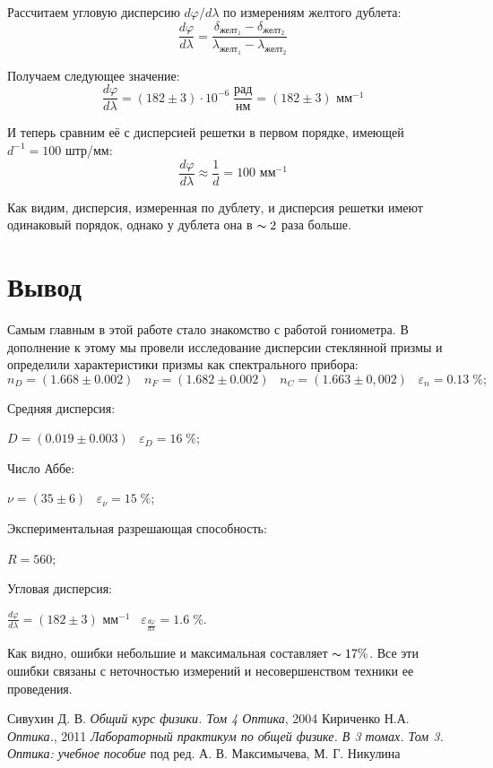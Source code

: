 \documentclass[12pt,a4paper]{article}
\begin{document}
	Рассчитаем угловую дисперсию $d\varphi/d\lambda$ по измерениям желтого дублета:
	\begin{equation*}
		\frac{d\varphi}{d\lambda} = \frac{\delta_{\text{желт}_1} - \delta_{\text{желт}_2}}{\lambda_{\text{желт}_1} - \lambda_{\text{желт}_2}}
	\end{equation*}

	Получаем следующее значение:
	\begin{equation*}
		\boxed{\frac{d \varphi}{d \lambda} = (182 \pm 3) \cdot 10^{-6} \; \frac{\text{рад}}{\text{нм}} = (182 \pm 3) \text{ мм}^{-1}}
	\end{equation*}

	И теперь сравним её с дисперсией решетки в первом порядке, имеющей $d^{-1} = 100$ штр/мм:
	\begin{equation*}
		\boxed{\frac{d \varphi}{d \lambda} \approx \frac{1}{d} = 100 \text{ мм}^{-1}}
	\end{equation*}
	
	Как видим, дисперсия, измеренная по дублету, и дисперсия решетки имеют одинаковый порядок, однако у дублета она в $\thicksim 2$ раза больше. 
	
	
	\section*{Вывод}
	Самым главным в этой работе стало знакомство с работой гониометра. В дополнение к этому мы провели исследование дисперсии стеклянной призмы и определили характеристики призмы как спектрального прибора:
	\begin{equation*}
		n_D = (1.668 \pm 0.002) \;\;\; n_F = (1.682 \pm 0.002) \;\;\; n_C = (1.663 \pm 0,002) \;\;\; \varepsilon_n = 0.13 \; \%;
	\end{equation*}

\noindent	Средняя дисперсия:
	
\noindent	$D = (0.019 \pm 0.003) \;\;\; \varepsilon_D = 16 \; \%$;

\noindent	Число Аббе:
	
\noindent	$\nu = (35 \pm 6) \;\;\; \varepsilon_{\nu} = 15 \; \%$;

\noindent	Экспериментальная разрешающая способность:
	
\noindent	$R = 560$;
	
\noindent	Угловая дисперсия:
	
\noindent	$\frac{d \varphi}{d \lambda} = (182 \pm 3) \text{ мм}^{-1} \;\;\; \varepsilon_{\frac{d \varphi}{d \lambda}} = 1.6 \; \%$.

\vspace{5mm}

	Как видно, ошибки небольшие и максимальная составляет $\thicksim 17\%$. Все эти ошибки связаны с неточностью измерений и несовершенством техники ее проведения.

\newpage
\begin{thebibliography}{9}
	 Сивухин Д. В. \emph{Общий курс физики. Том 4 Оптика}, 2004
	 Кириченко Н.А. \emph{Оптика.}, 2011
	 \emph{Лабораторный практикум по общей физике. В 3 томах. Том 3. Оптика: учебное пособие} под ред. А. В. Максимычева, М. Г. Никулина
\end{thebibliography}
\end{document}
